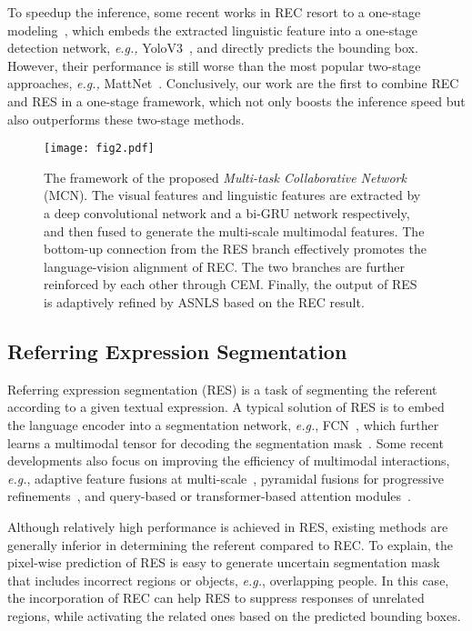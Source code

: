 \documentclass[10pt,twocolumn,letterpaper]{article}
\begin{document}
To speedup the inference, some recent works in REC resort to a  one-stage modeling~\cite{sadhu2017zero,yang2019fast}, which embeds the extracted linguistic feature into a one-stage detection network, \emph{e.g.,}  YoloV3~\cite{redmon2018yolov3:}, and directly predicts the bounding box. However, their performance is still worse than the most popular two-stage approaches, \emph{e.g.,} MattNet~\cite{yu2018mattnet:}. Conclusively, our work are the first  to combine REC and RES in a one-stage framework, which not only boosts the inference speed but also outperforms  these two-stage methods. 


\begin{figure*}[t]
	\centering
	\texttt{[image: fig2.pdf]}
\caption{The framework of the proposed \emph{Multi-task Collaborative Network} (MCN). The visual features and linguistic  features are extracted by a deep convolutional network and a bi-GRU network respectively, and then fused to generate the  multi-scale multimodal features. The bottom-up connection from the RES branch effectively promotes the language-vision alignment of REC.  The two branches   are further reinforced by each other through  CEM. Finally, the  output of RES is  adaptively refined by ASNLS based on the REC result.}
	\label{fig2} 
	\vspace{-0.5em}
\end{figure*}
\subsection{Referring Expression Segmentation}
Referring expression segmentation (RES) is a task of segmenting  the  referent according to a given textual expression. A typical solution of RES is to embed the language encoder into a  segmentation network, \emph{e.g.}, FCN~\cite{FCN}, which further learns a multimodal tensor for decoding the segmentation mask~\cite{LSTM-CNN,RRN,DMN,CMSA,KWA}. Some recent developments also focus on improving the efficiency of multimodal interactions, \emph{e.g.},  adaptive feature fusions at multi-scale~\cite{LSTM-CNN},  pyramidal fusions for progressive refinements~\cite{RRN,DMN}, and query-based or transformer-based attention modules~\cite{KWA,CMSA}. 

Although  relatively high performance is achieved in RES, existing methods are generally inferior in determining the referent compared to  REC. To explain, the pixel-wise prediction of RES  is easy to generate uncertain segmentation mask that includes incorrect regions or objects, \emph{e.g.}, overlapping people. 
In this case, the incorporation of REC can help  RES to suppress responses of unrelated regions, while activating the related ones based on the predicted bounding boxes.
\end{document}
